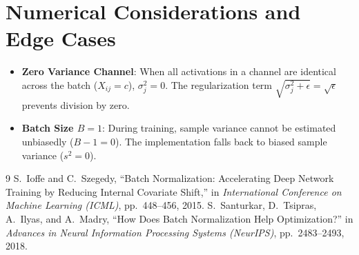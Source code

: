 \documentclass[11pt,a4paper]{article}
\theoremstyle{definition}
\begin{document}
\section{Numerical Considerations and Edge Cases}

\begin{itemize}
    \item \textbf{Zero Variance Channel}: When all activations in a channel are identical across the batch ($X_{ij} = c$), $\sigma_j^2 = 0$. The regularization term $\sqrt{\sigma_j^2 + \epsilon} = \sqrt{\epsilon}$ prevents division by zero.
    \item \textbf{Batch Size $B = 1$}: During training, sample variance cannot be estimated unbiasedly ($B - 1 = 0$). The implementation falls back to biased sample variance ($s^2 = 0$).
\end{itemize}

\begin{thebibliography}{9}
 S.~Ioffe and C.~Szegedy, ``Batch Normalization: Accelerating Deep Network Training by Reducing Internal Covariate Shift,'' in \emph{International Conference on Machine Learning (ICML)}, pp.~448--456, 2015.
 S.~Santurkar, D.~Tsipras, A.~Ilyas, and A.~Madry, ``How Does Batch Normalization Help Optimization?'' in \emph{Advances in Neural Information Processing Systems (NeurIPS)}, pp.~2483--2493, 2018.
\end{thebibliography}
\end{document}
